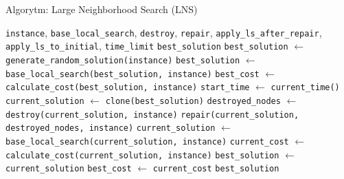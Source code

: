 \documentclass[12pt,a4paper]{article}
\begin{document}
\begin{algorithm}[H]
\caption{Algorytm: Large Neighborhood Search (LNS)}
\label{alg:lns}
\begin{algorithmic}[1]
\Require \texttt{instance}, \texttt{base\_local\_search}, \texttt{destroy}, \texttt{repair}, \texttt{apply\_ls\_after\_repair}, \texttt{apply\_ls\_to\_initial}, \texttt{time\_limit}
\Ensure \texttt{best\_solution}
\State \texttt{best\_solution} $\leftarrow$ \texttt{generate\_random\_solution(instance)}
    \State \texttt{best\_solution} $\leftarrow$ \texttt{base\_local\_search(best\_solution, instance)}
\EndIf
\State \texttt{best\_cost} $\leftarrow$ \texttt{calculate\_cost(best\_solution, instance)}
\State \texttt{start\_time} $\leftarrow$ \texttt{current\_time()}
    \State \texttt{current\_solution} $\leftarrow$ \texttt{clone(best\_solution)}
    \State \texttt{destroyed\_nodes} $\leftarrow$ \texttt{destroy(current\_solution, instance)}
    \State \texttt{repair(current\_solution, destroyed\_nodes, instance)} 
        \State \texttt{current\_solution} $\leftarrow$ \texttt{base\_local\_search(current\_solution, instance)}
    \EndIf
    \State \texttt{current\_cost} $\leftarrow$ \texttt{calculate\_cost(current\_solution, instance)}
        \State \texttt{best\_solution} $\leftarrow$ \texttt{current\_solution}
        \State \texttt{best\_cost} $\leftarrow$ \texttt{current\_cost}
    \EndIf
\EndWhile
\State \Return \texttt{best\_solution}
\end{algorithmic}
\end{algorithm}
\end{document}

